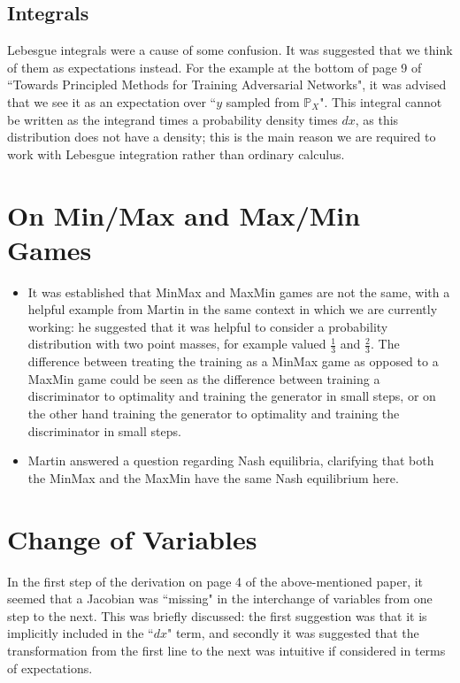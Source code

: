 \documentclass{article}
\begin{document}
	
\subsection{Integrals}
Lebesgue integrals were a cause of some confusion. It was suggested that we think of them as expectations instead. For the example at the bottom of page 9 of ``Towards Principled Methods for Training Adversarial Networks", it was advised that we see it as an expectation over ``$y$ sampled from $\mathbb{P}_X$". 
This integral cannot be written as the integrand times a probability density times $dx$, as this distribution does not have a density; this is the main reason we are required to work with Lebesgue integration rather than ordinary calculus.  


\section{On Min/Max and Max/Min Games}
\begin{itemize}
	\item It was established that MinMax and MaxMin games are not the same, with a helpful example from Martin in the same context in which we are currently working: he suggested that it was helpful to consider a probability distribution with two point masses, for example valued $\frac{1}{3}$ and $\frac{2}{3}$. The difference between treating the training as a MinMax game as opposed to a MaxMin game could be seen as the difference between training a discriminator to optimality and training the generator in small steps, or on the other hand training the generator to optimality and training the discriminator in small steps.
	\item Martin answered a question regarding Nash equilibria, clarifying that both the MinMax and the MaxMin have the same Nash equilibrium here. 
	
\end{itemize}

\section{Change of Variables}
In the first step of the derivation on page 4 of the above-mentioned paper, it seemed that a Jacobian was ``missing" in the interchange of variables from one step to the next. This was briefly discussed: the first suggestion was that it is implicitly included in the ``$dx$" term, and secondly it was suggested that the transformation from the first line to the next was intuitive if considered in terms of expectations. 
\end{document}
